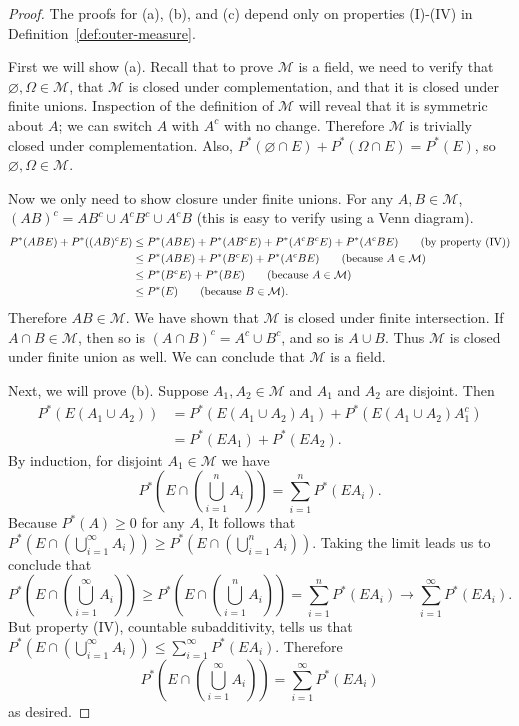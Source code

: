 \documentclass[11pt,fleqn]{book} %
\begin{document}
\begin{proof}
	The proofs for (a), (b), and (c) depend only on properties (I)-(IV) in Definition~\ref{def:outer-measure}.

	\vspace{10pt}
	First we will show (a). Recall that to prove $\mathcal{M}$ is a field, we need to verify that $\varnothing, \Omega \in \mathcal{M}$, that $\mathcal{M}$ is closed under complementation, and that it is closed under finite unions. Inspection of the definition of $\mathcal{M}$ will reveal that it is symmetric about $A$; we can switch $A$ with $A^c$ with no change. Therefore $\mathcal{M}$ is trivially closed under complementation. Also, $P^*(\varnothing \cap E) + P^*(\Omega \cap E) = P^*(E)$, so $\varnothing, \Omega \in \mathcal{M}$.

	Now we only need to show closure under finite unions. For any $A,B \in \mathcal{M}$, $(AB)^c = AB^c \cup A^cB^c \cup A^cB$ (this is easy to verify using a Venn diagram).
	\begin{align*}
		P^*(ABE) + P^*((AB)^cE) &\leq P^*(ABE) + P^*(AB^cE) + P^*(A^cB^cE) + P^*(A^cBE) \tag{by property (IV)} \\
		&\leq P^*(ABE) + P^*(B^cE) + P^*(A^cBE) \tag{because $A \in \mathcal{M}$} \\
		&\leq P^*(B^cE) + P^*(BE) \tag{because $A \in \mathcal{M}$} \\
		&\leq P^*(E) \tag{because $B \in \mathcal{M}$}.
	\end{align*}
	Therefore $AB \in \mathcal{M}$. We have shown that $\mathcal{M}$ is closed under finite intersection. If $A \cap B \in \mathcal{M}$, then so is $(A \cap B)^c = A^c \cup B^c$, and so is $A \cup B$. Thus $\mathcal{M}$ is closed under finite union as well. We can conclude that $\mathcal{M}$ is a field.

	\vspace{10pt}
	Next, we will prove (b). Suppose $A_1,A_2 \in \mathcal{M}$ and $A_1$ and $A_2$ are disjoint. Then
	\begin{align*}
		P^*(E(A_1 \cup A_2)) &= P^*(E(A_1 \cup A_2)A_1) + P^*(E(A_1 \cup A_2)A_1^c) \\
		&= P^*(EA_1)+P^*(EA_2) \tag{because $A_2 \subset A_1^c$}.
	\end{align*}
	By induction, for disjoint $A_1 \in \mathcal{M}$ we have
	\[
		P^*\left( E \cap \left( \bigcup_{i=1}^n A_i \right) \right) = \sum_{i=1}^n P^*(EA_i).
	\]
	Because $P^*(A) \geq 0$ for any $A$, It follows that $P^*(E \cap (\bigcup_{i=1}^\infty A_i)) \geq P^*(E \cap (\bigcup_{i=1}^n A_i))$. Taking the limit leads us to conclude that
	\[
		P^* \left( E \cap \left( \bigcup_{i=1}^\infty A_i \right) \right) \geq P^*\left( E \cap \left( \bigcup_{i=1}^n A_i \right) \right) = \sum_{i=1}^n P^*(EA_i) \rightarrow \sum_{i=1}^\infty P^*(EA_i).
	\]
	But property (IV), countable subadditivity, tells us that $P^*(E \cap (\bigcup_{i=1}^\infty A_i)) \leq \sum_{i=1}^\infty P^*(EA_i)$. Therefore
	\[
		P^* \left( E \cap \left( \bigcup_{i=1}^\infty A_i \right) \right) = \sum_{i=1}^\infty P^*(EA_i)
	\]
	as desired.


\end{proof}
\end{document}
